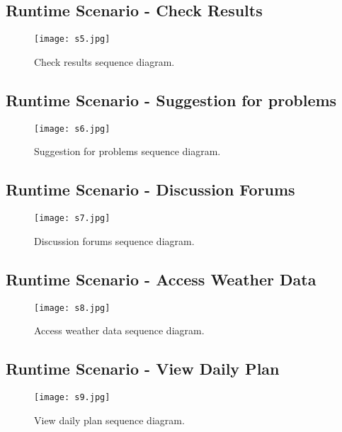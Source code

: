 \documentclass[../../main.tex]{subfiles}
\begin{document}
\subsection{Runtime Scenario  - Check Results}

\begin{figure}[H]
    \centering
    \texttt{[image: s5.jpg]}
    \caption{
        Check results sequence diagram.
    }
\end{figure}

\subsection{Runtime Scenario  - Suggestion for problems}

\begin{figure}[H]
    \centering
    \texttt{[image: s6.jpg]}
    \caption{
        Suggestion for problems sequence diagram.
    }
\end{figure}

\subsection{Runtime Scenario  - Discussion Forums}

\begin{figure}[H]
    \centering
    \texttt{[image: s7.jpg]}
    \caption{
        Discussion forums sequence diagram.
    }
\end{figure}


\subsection{Runtime Scenario  - Access Weather Data}

\begin{figure}[H]
    \centering
    \texttt{[image: s8.jpg]}
    \caption{
        Access weather data sequence diagram.
    }
\end{figure}


\subsection{Runtime Scenario  - View Daily Plan}

\begin{figure}[H]
    \centering
    \texttt{[image: s9.jpg]}
    \caption{
        View daily plan sequence diagram.
    }
\end{figure}
\end{document}
